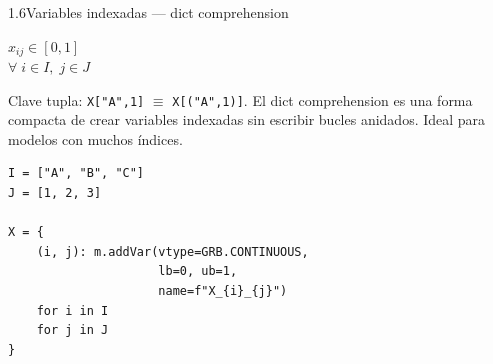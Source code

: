 \documentclass[10pt,a4paper]{article}
\newlength{\mathcolw}
\newlength{\codecolw}
\newcommand{\entryheader}[1]{%
  \needspace{5cm}%
  \vspace{6pt}%
  \noindent%
  \begin{tcolorbox}[
    colback=subsecbg!18,
    colframe=subsecbg!45,
    sharp corners, boxrule=0.4pt,
    left=5pt, right=5pt, top=2pt, bottom=2pt,
    fontupper=\small\bfseries\sffamily,
  ]
  #1
  \end{tcolorbox}%
  \vspace{2pt}%
}
\newcommand{\py}[1]{\texttt{\small #1}}
\begin{document}
\vspace{4pt}

\entryheader{1.6\quad Variables indexadas --- dict comprehension}
\noindent
\begin{minipage}[t]{\mathcolw}
    \begin{tcolorbox}[mathbox]
        $x_{ij} \in [0,1]$\\[4pt]
        $\forall\; i \in I,\; j \in J$
    \end{tcolorbox}
    \vspace{2pt}
    \begin{tcolorbox}[notebox]
        Clave tupla: \py{X["A",1]} $\equiv$ \py{X[("A",1)]}. El dict comprehension es una forma compacta de crear variables indexadas sin escribir bucles anidados. Ideal para modelos con muchos índices.
    \end{tcolorbox}
\end{minipage}\hspace{0.02\textwidth}%
\begin{minipage}[t]{\codecolw}
    \begin{lstlisting}[style=gurobipy]
I = ["A", "B", "C"]
J = [1, 2, 3]

X = {
    (i, j): m.addVar(vtype=GRB.CONTINUOUS,
                     lb=0, ub=1,
                     name=f"X_{i}_{j}")
    for i in I
    for j in J
}
\end{lstlisting}
\end{minipage}

\vspace{4pt}
\end{document}
